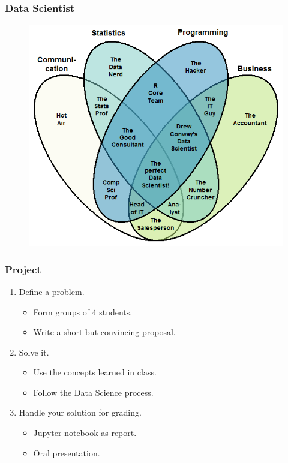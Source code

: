 \documentclass{beamer}
\newcommand{\todo}[1]{{\color{red} #1}}
\begin{document}
\begin{frame}
	\frametitle{Data Scientist}
	\begin{figure}
		\includegraphics[height=0.8\textheight]{data_scientist}
	\end{figure}
\end{frame}


\begin{frame}
	\frametitle{Project}
	\begin{enumerate}
		\item Define a problem.
			\begin{itemize}
				\item Form groups \todo{of 4 students}.
				\item Write a short but convincing proposal.
			\end{itemize}
		\vfill
		\item Solve it.
			\begin{itemize}
				\item Use the concepts learned in class.
				\item Follow the Data Science process.
			\end{itemize}
		\vfill
		\item Handle your solution for grading.
			\begin{itemize}
				\item Jupyter notebook as report.
				\item Oral presentation.
			\end{itemize}
	\end{enumerate}
\end{frame}
\end{document}
